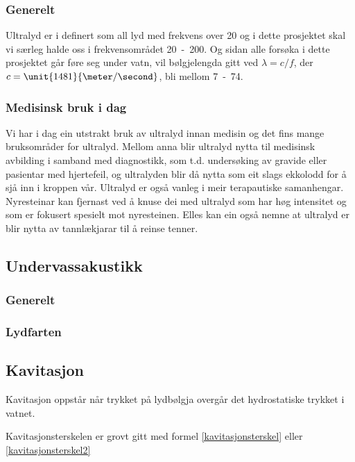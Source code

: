 \subsubsection*{Generelt}
Ultralyd er i \cite[s. 443]{citeulike:4412590} definert som all lyd med frekvens over \unit{20}{\kilo \hertz} og i dette prosjektet skal vi særleg halde oss i frekvensområdet \unit{20 - 200}{\kilo \hertz}. Og sidan alle forsøka i dette prosjektet går føre seg under vatn, vil bølgjelengda gitt ved $\lambda = c / f$, der $c = \unit{1481}{\meter / \second}$, bli mellom \unit{7 - 74}{\milli\meter}.

\subsubsection*{Medisinsk bruk i dag}
Vi har i dag ein utstrakt bruk av ultralyd innan medisin og det fins mange bruksområder for ultralyd. Mellom anna blir ultralyd nytta til medisinsk avbilding i samband med diagnostikk, som t.d. undersøking av gravide eller pasientar med hjertefeil, og ultralyden blir då nytta som eit slags ekkolodd for å sjå inn i kroppen vår. Ultralyd er også vanleg i meir terapautiske samanhengar. Nyresteinar kan fjernast ved å knuse dei med ultralyd som har høg intensitet og som er fokusert spesielt mot nyresteinen. Elles kan ein også nemne at ultralyd er blir nytta av tannlækjarar til å reinse tenner.

\subsection{Undervassakustikk}

\subsubsection*{Generelt}

\subsubsection*{Lydfarten}

\subsection{Kavitasjon}
Kavitasjon oppstår når trykket på lydbølgja overgår det hydrostatiske trykket i vatnet.\cite{Kinsler:2000rc}

Kavitasjonsterskelen er grovt gitt\cite{kavitasjon} med formel \eqref{kavitasjonsterskel} eller \eqref{kavitasjonsterskel2}

